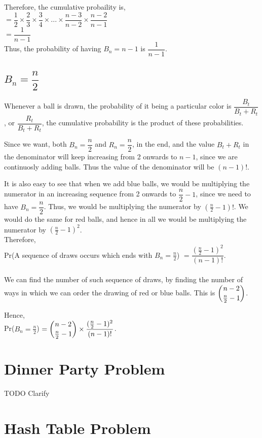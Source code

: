 \documentclass{article}
\begin{document}
Therefore, the cumulative probaility is, \\
$= \dfrac{1}{2} \times \dfrac{2}{3} \times \dfrac{3}{4} \times ... \times \dfrac{n-3}{n-2} \times \dfrac{n-2}{n-1}$ \\
$= \dfrac{1}{n-1}$ \\
Thus, the probability of having $B_{n} = n-1$ is $\dfrac{1}{n-1}$.
\subsection{$B_{n} = \dfrac{n}{2}$}
Whenever a ball is drawn, the probability of it being a 
particular color is $\dfrac{B_{t}}{B_{t} + R_{t}}$, or
$\dfrac{R_{t}}{B_{t}+R_{t}}$, the cumulative probability
is the product of these probabilities.

Since we want, both $B_{n} = \dfrac{n}{2}$ and 
$R_{n} = \dfrac{n}{2}$, in the end, and the value 
$B_{t}+R_{t}$ in the denominator will keep increasing
from 2 onwards to $n-1$, since we are continuosly adding
balls. Thus the value of the denominator will be $(n-1)!$.

It is also easy to see that when we add blue balls, we
would be multiplying the numerator in an increasing 
sequence from 2 onwards to $\dfrac{n}{2}-1$, since we
need to have $B_{n} = \dfrac{n}{2}$. Thus, we would
be multiplying the numerator by $(\frac{n}{2}-1)!$.
We would do the same for red balls, and hence in all
we would be multiplying the numerator by 
$(\frac{n}{2}-1)^2$. \\

Therefore,\\
Pr(A sequence of draws occurs which ends with $B_{n} = \frac{n}{2}$) $ = \dfrac{(\frac{n}{2}-1)^2}{(n-1)!} $.
\\
\\
We can find the number of such sequence of draws, by
finding the number of ways in which we can order the
drawing of red or blue balls. This is $\dbinom{n-2}{\frac{n}{2}-1}$.

Hence, \\
Pr($B_n = \frac{n}{2}$) $ = 
\dbinom{n-2}{\frac{n}{2}-1} \times
\dfrac{(\frac{n}{2}-1)^2}{(n-1)!}$.  
\clearpage

\section{Dinner Party Problem}
TODO Clarify

\clearpage

\section{Hash Table Problem}
\end{document}
